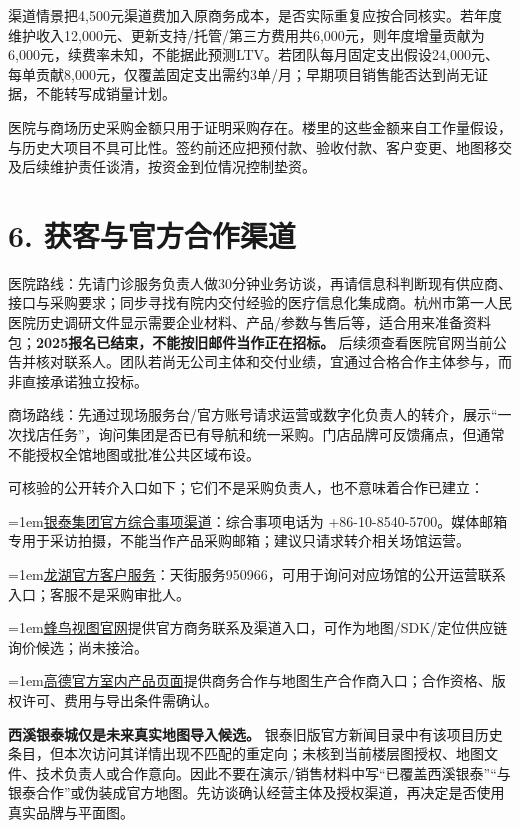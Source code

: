 \documentclass[UTF8,10pt,fontset=fandol]{ctexart}
\begin{document}
渠道情景把4,500元渠道费加入原商务成本，是否实际重复应按合同核实。若年度维护收入12,000元、更新支持/托管/第三方费用共6,000元，则年度增量贡献为6,000元，续费率未知，不能据此预测LTV。若团队每月固定支出假设24,000元、每单贡献8,000元，仅覆盖固定支出需约3单/月；早期项目销售能否达到尚无证据，不能转写成销量计划。\par
医院与商场历史采购金额只用于证明采购存在。楼里的这些金额来自工作量假设，与历史大项目不具可比性。签约前还应把预付款、验收付款、客户变更、地图移交及后续维护责任谈清，按资金到位情况控制垫资。\par
\section*{6. 获客与官方合作渠道}
医院路线：先请门诊服务负责人做30分钟业务访谈，再请信息科判断现有供应商、接口与采购要求；同步寻找有院内交付经验的医疗信息化集成商。杭州市第一人民医院历史调研文件显示需要企业材料、产品/参数与售后等，适合用来准备资料包；\textbf{2025报名已结束，不能按旧邮件当作正在招标。} 后续须查看医院官网当前公告并核对联系人。团队若尚无公司主体和交付业绩，宜通过合格合作主体参与，而非直接承诺独立投标。\par
商场路线：先通过现场服务台/官方账号请求运营或数字化负责人的转介，展示“一次找店任务”，询问集团是否已有导航和统一采购。门店品牌可反馈痛点，但通常不能授权全馆地图或批准公共区域布设。\par
可核验的公开转介入口如下；它们不是采购负责人，也不意味着合作已建立：\par
\par\hangindent=1em\textcolor{brand}{\textbullet}\quad \href{https://www.china-yintai.com/zh-CN/news/media}{银泰集团官方综合事项渠道}：综合事项电话为 +86-10-8540-5700。媒体邮箱专用于采访拍摄，不能当作产品采购邮箱；建议只请求转介相关场馆运营。\par
\par\hangindent=1em\textcolor{brand}{\textbullet}\quad \href{https://www.longfor.com/customer/contact.html}{龙湖官方客户服务}：天街服务950966，可用于询问对应场馆的公开运营联系入口；客服不是采购审批人。\par
\par\hangindent=1em\textcolor{brand}{\textbullet}\quad \href{https://www.fengmap.com/navigation/}{蜂鸟视图官网}提供官方商务联系及渠道入口，可作为地图/SDK/定位供应链询价候选；尚未接洽。\par
\par\hangindent=1em\textcolor{brand}{\textbullet}\quad \href{https://lbs.amap.com/product/indoorintro}{高德官方室内产品页面}提供商务合作与地图生产合作商入口；合作资格、版权许可、费用与导出条件需确认。\par
\textbf{西溪银泰城仅是未来真实地图导入候选。} 银泰旧版官方新闻目录中有该项目历史条目，但本次访问其详情出现不匹配的重定向；未核到当前楼层图授权、地图文件、技术负责人或合作意向。因此不要在演示/销售材料中写“已覆盖西溪银泰”“与银泰合作”或伪装成官方地图。先访谈确认经营主体及授权渠道，再决定是否使用真实品牌与平面图。\par
\end{document}
